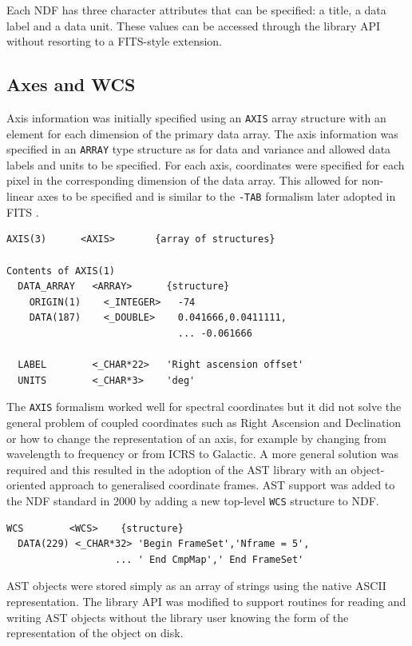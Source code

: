 \documentclass[final,authoryear,5p,times,twocolumn]{elsarticle}
\begin{document}
Each NDF has three character attributes that can be specified: a
title, a data label and a data unit. These values can be accessed
through the library API without resorting to a FITS-style extension.

\subsection{Axes and WCS}

Axis information was initially specified using an \texttt{AXIS} array
structure with an element for each dimension of the primary data
array. The axis information was specified in an \texttt{ARRAY} type
structure as for data and variance and allowed data labels and units
to be specified. For each axis, coordinates were specified for each
pixel in the corresponding dimension of the data array. This allowed
for non-linear axes to be specified and is similar to the
\texttt{-TAB} formalism later adopted in FITS \citep{2006A&A...446..747G}.

{\small
\begin{verbatim}
AXIS(3)      <AXIS>       {array of structures}

Contents of AXIS(1)
  DATA_ARRAY   <ARRAY>      {structure}
    ORIGIN(1)    <_INTEGER>   -74
    DATA(187)    <_DOUBLE>    0.041666,0.0411111,
                              ... -0.061666

  LABEL        <_CHAR*22>   'Right ascension offset'
  UNITS        <_CHAR*3>    'deg'
\end{verbatim}
}

The \texttt{AXIS} formalism worked well for spectral coordinates but
it did not solve the general problem of coupled coordinates such as
Right Ascension and Declination or how to change the representation of
an axis, for example by changing from wavelength to frequency or from
ICRS to Galactic. A more general solution was required and this
resulted in the adoption of the AST library
\citep{1998ASPC..145...41W} with an object-oriented approach to
generalised coordinate frames. AST support was added to the NDF
standard in 2000 \citep{2001ASPC..238..129B} by adding a new top-level
\texttt{WCS} structure to NDF.

{\small
\begin{verbatim}
WCS        <WCS>    {structure}
  DATA(229) <_CHAR*32> 'Begin FrameSet','Nframe = 5',
                   ... ' End CmpMap',' End FrameSet'
\end{verbatim}
}

AST objects were stored simply as an array of strings using the native
ASCII representation. The library API was modified to support routines
for reading and writing AST objects without the library user knowing
the form of the representation of the object on disk.
\end{document}
